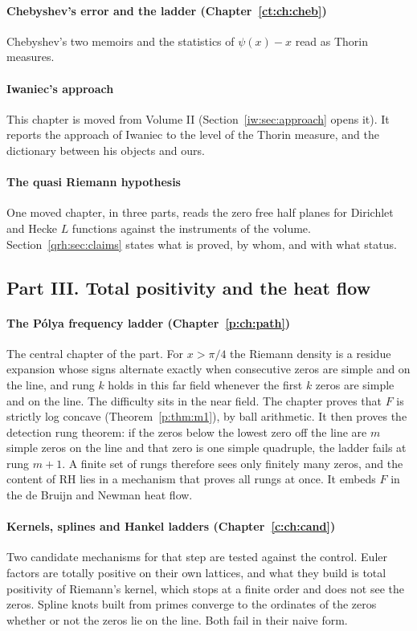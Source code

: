 \paragraph{Chebyshev's error and the ladder (Chapter~\ref{ct:ch:cheb})} Chebyshev's two memoirs and the statistics of $\psi(x)-x$ read as Thorin measures.

\paragraph{Iwaniec's approach} This chapter is moved from Volume II (Section~\ref{iw:sec:approach} opens it). It reports the approach of Iwaniec to the level of the Thorin measure, and the dictionary between his objects and ours.

\paragraph{The quasi Riemann hypothesis} One moved chapter, in three parts, reads the zero free half planes for Dirichlet and Hecke $L$ functions against the instruments of the volume. Section~\ref{qrh:sec:claims} states what is proved, by whom, and with what status.

\subsection*{Part III. Total positivity and the heat flow}

\paragraph{The P\'olya frequency ladder (Chapter~\ref{p:ch:path})} The central chapter of the part. For $x>\pi/4$ the Riemann density is a residue expansion whose signs alternate exactly when consecutive zeros are simple and on the line, and rung $k$ holds in this far field whenever the first $k$ zeros are simple and on the line. The difficulty sits in the near field. The chapter proves that $F$ is strictly log concave (Theorem~\ref{p:thm:m1}), by ball arithmetic. It then proves the detection rung theorem: if the zeros below the lowest zero off the line are $m$ simple zeros on the line and that zero is one simple quadruple, the ladder fails at rung $m+1$. A finite set of rungs therefore sees only finitely many zeros, and the content of RH lies in a mechanism that proves all rungs at once. It embeds $F$ in the de Bruijn and Newman heat flow.

\paragraph{Kernels, splines and Hankel ladders (Chapter~\ref{c:ch:cand})} Two candidate mechanisms for that step are tested against the control. Euler factors are totally positive on their own lattices, and what they build is total positivity of Riemann's kernel, which stops at a finite order and does not see the zeros. Spline knots built from primes converge to the ordinates of the zeros whether or not the zeros lie on the line. Both fail in their naive form.

